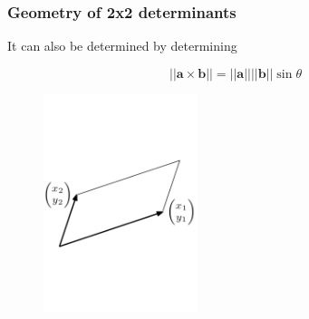 \documentclass{beamer}
\begin{document}
\begin{frame}
\frametitle{Geometry of 2x2 determinants}
It can also be determined by determining 

$$|| \mathbf{a} \times \mathbf{b}|| = || \mathbf{a} || ||\mathbf{b}|| \sin{\theta}$$    
\begin{figure}[htbp]
\begin{center}
 \includegraphics[width=0.4\textwidth]{parallelogram.pdf}
\caption{}
\end{center}
\end{figure}
\end{frame}
\end{document}
